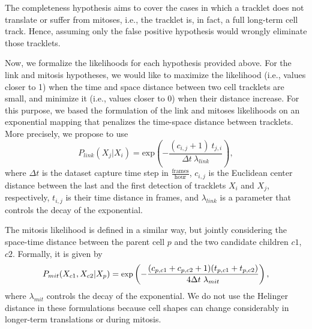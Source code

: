 \documentclass{article}
\begin{document}
\begin{itemize}
    The completeness hypothesis aims to cover the cases in which a tracklet does not translate or suffer from mitoses, i.e., the tracklet is, in fact, a full long-term cell track. Hence, assuming only the false positive hypothesis would wrongly eliminate those tracklets.
\end{itemize}

Now, we formalize the likelihoods for each hypothesis provided above. For the link and mitosis hypotheses, we would like to maximize the likelihood (i.e., values closer to 1) when the time and space distance between two cell tracklets are small, and minimize it (i.e., values closer to 0) when their distance increase. For this purpose, we based the formulation of the link and mitoses likelihoods on an exponential mapping that penalizes the time-space distance between tracklets. More precisely, we propose to use
\begin{equation}
    P_{link}(X_j|X_i) = \text{exp}\left(-\frac{(c_{i,j}+1)~t_{j,i}}{\Delta t~\lambda_{link}} \right),
\end{equation}
where $\Delta t$ is the dataset capture time step in $\frac{\text{frames}}{\text{hour}}$, $c_{i,j}$ is the Euclidean center distance between the last and the first detection of tracklets $X_i$ and $X_j$, respectively, $t_{i,j}$ is their time distance in frames, and $\lambda_{link}$ is a parameter that controls the decay of the exponential.

The mitosis likelihood is defined in a similar way, but jointly considering the space-time distance between the parent cell $p$ and the two candidate children $c1$, $c2$. Formally, it is given by
\begin{equation}
    \small
    P_{mit}(X_{c1},X_{c2}|X_p) = \text{exp}\left(-\frac{(c_{p,c1}+c_{p,c2}+1)(t_{p,c1}+t_{p,c2})}{4\Delta t~\lambda_{mit}} \right),
    \label{abc}
\end{equation}
where $\lambda_{mit}$ controls the decay of the exponential. We do not use the Helinger distance in these formulations because cell shapes can change considerably in longer-term translations or during mitosis.
\end{document}

